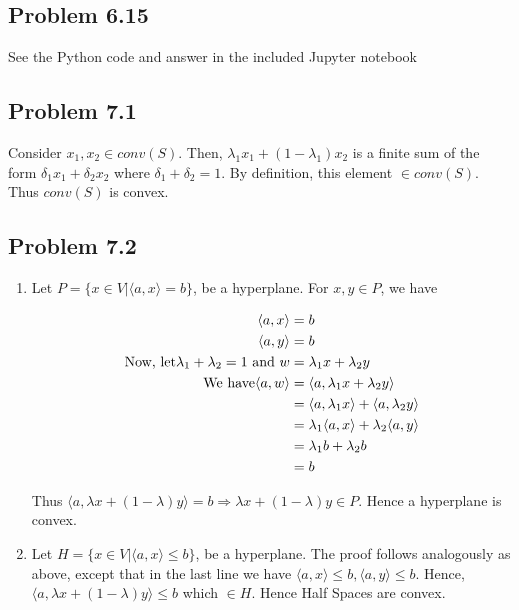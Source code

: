\documentclass[letterpaper,12pt]{article}
\theoremstyle{definition}
\begin{document}
\subsection*{Problem 6.15}

See the Python code and answer in the included Jupyter notebook

\subsection*{Problem 7.1}

Consider $x_1, x_2 \in conv(S)$. Then, $\lambda_1x_1+ (1-\lambda_1)x_2$ is a finite sum of the form $\delta_1x_1 + \delta_2x_2$ where $\delta_1 + \delta_2 = 1$. By definition, this element $\in conv(S)$. Thus $conv(S)$ is convex.

\subsection*{Problem 7.2}
\begin{enumerate}
\item
Let $ P = \{x \in V | \langle a,x\rangle = b\}$, be a hyperplane. For  $x,y \in P $, we have

\begin{align*}
\langle a,x\rangle &= b\\
\langle a, y\rangle &= b\\
\textnormal{Now, let} \lambda_1 + \lambda_2 = 1 \textnormal { and } w &= \lambda_1x + \lambda_2y\\
\textnormal{We have} \langle a,w\rangle &= \langle a, \lambda_1x + \lambda_2y \rangle\\
&= \langle a,\lambda_1x\rangle + \langle a, \lambda_2y \rangle\\
&= \lambda_1 \langle a,x \rangle + \lambda_2 \langle a,y \rangle\\
&= \lambda_1b + \lambda_2b\\
&= b
\end{align*}

Thus $\langle a, \lambda x + (1-\lambda)y \rangle = b \Rightarrow \lambda x + (1-\lambda)y \in P$. Hence a hyperplane is convex.

\item
Let $ H = \{x \in V | \langle a,x\rangle \leq b\}$, be a hyperplane. The proof follows analogously as above, except that in the last line we have $\langle a, x \rangle \le b, \langle a, y\rangle \le b$. Hence, $\langle a,\lambda x + (1-\lambda)y\rangle \le b $ which $\in H$. Hence Half Spaces are convex.

\end{enumerate}
\end{document}
